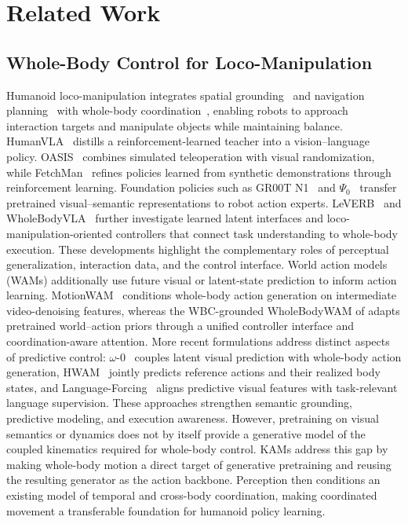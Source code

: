 \begingroup
\linespread{0.97}\selectfont
\section{Related Work}
\label{sec:related_work}

\subsection{Whole-Body Control for Loco-Manipulation}
\label{sec:related_whole_body}
Humanoid loco-manipulation integrates spatial grounding~\citep{wang2026limitsvisionandlanguagenavigation,uniground} and navigation planning~\citep{wang2025dreamnavtrajectorybasedimaginativeframework,hero} with whole-body coordination~\citep{leverb,openhlm}, enabling robots to approach interaction targets and manipulate objects while maintaining balance. HumanVLA~\citep{humanvla} distills a reinforcement-learned teacher into a vision--language policy. OASIS~\citep{oasis} combines simulated teleoperation with visual randomization, while FetchMan~\citep{fetchman} refines policies learned from synthetic demonstrations through reinforcement learning. Foundation policies such as GR00T N1~\citep{grootn1} and $\Psi_0$~\citep{psi0} transfer pretrained visual--semantic representations to robot action experts. LeVERB~\citep{leverb} and WholeBodyVLA~\citep{wholebodyvla} further investigate learned latent interfaces and loco-manipulation-oriented controllers that connect task understanding to whole-body execution. These developments highlight the complementary roles of perceptual generalization, interaction data, and the control interface. World action models (WAMs) additionally use future visual or latent-state prediction to inform action learning. MotionWAM~\citep{motionwam} conditions whole-body action generation on intermediate video-denoising features, whereas the WBC-grounded WholeBodyWAM of \citet{wholebodywam_wbc} adapts pretrained world--action priors through a unified controller interface and coordination-aware attention. More recent formulations address distinct aspects of predictive control: $\omega$-0~\citep{omega0} couples latent visual prediction with whole-body action generation, HWAM~\citep{hwam} jointly predicts reference actions and their realized body states, and Language-Forcing~\citep{li2026languageforcing} aligns predictive visual features with task-relevant language supervision. These approaches strengthen semantic grounding, predictive modeling, and execution awareness. However, pretraining on visual semantics or dynamics does not by itself provide a generative model of the coupled kinematics required for whole-body control. KAMs address this gap by making whole-body motion a direct target of generative pretraining and reusing the resulting generator as the action backbone. Perception then conditions an existing model of temporal and cross-body coordination, making coordinated movement a transferable foundation for humanoid policy learning.

